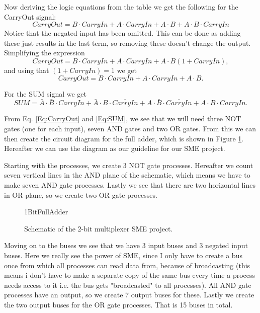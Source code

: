         Now deriving the logic equations from the table we get the following for the CarryOut signal:
        \begin{equation}
            CarryOut = B \cdot CarryIn + A \cdot CarryIn + A \cdot B + A \cdot B \cdot CarryIn
        \end{equation}
        Notice that the negated input has been omitted. This can be done as adding these just results in the last term, so removing these doesn't change the output. Simplifying the expression
        \begin{equation}
            CarryOut = B \cdot CarryIn + A \cdot CarryIn + A \cdot B (1 + CarryIn),
        \end{equation}
        and using that $(1 + CarryIn) = 1$ we get
        \begin{equation}\label{Eq:CarryOut}
            CarryOut = B \cdot CarryIn + A \cdot CarryIn + A \cdot B. 
        \end{equation}
        
        For the SUM signal we get
        \begin{equation}\label{Eq:SUM}
            SUM = \bar{A} \cdot \bar{B} \cdot CarryIn + \bar{A} \cdot B \cdot \overline{CarryIn} + A \cdot \bar{B} \cdot \overline{CarryIn} + A \cdot B \cdot CarryIn.
        \end{equation}
        
        From Eq. \ref{Eq:CarryOut} and \ref{Eq:SUM}, we see that we will need three NOT gates (one for each input), seven AND gates and two OR gates. From this we can then create the circuit diagram for the full adder, which is shown in Figure \ref{fig:1BitFullAdderSchematic}. Hereafter we can use the diagram as our guideline for our SME project.
        
        Starting with the processes, we create 3 NOT gate processes. Hereafter we count seven vertical lines in the AND plane of the schematic, which means we have to make seven AND gate processes. Lastly we see that there are two horizontal lines in OR plane, so we create two OR gate processes.
        
        \begin{figure}[h!]
            \centering
            {1BitFullAdder}
            \caption{Schematic of the 2-bit multiplexer SME project.}
            \label{fig:1BitFullAdderSchematic}
        \end{figure}
        
        Moving on to the buses we see that we have 3 input buses and 3 negated input buses. Here we really see the power of SME, since I only have to create a bus once from which all processes can read data from, because of broadcasting (this means i don't have to make a separate copy of the same bus every time a process needs access to it i.e. the bus gets "broadcasted" to all processes). All AND gate processes have an output, so we create 7 output buses for these. Lastly we create the two output buses for the OR gate processes. That is 15 buses in total.  
        
